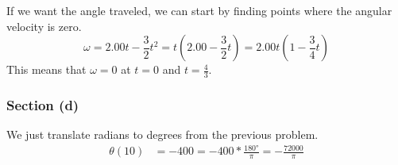 \documentclass[12pt]{article}
\begin{document}
If we want the angle traveled, we can start by finding points where the angular velocity is zero. 
\[ \omega = 2.00t - \frac{3}{2}t^2 = t(2.00 - \frac{3}{2}t) = 2.00t(1 - \frac{3}{4}t) \]
This means that $\omega = 0$ at $t = 0$ and $t = \frac{4}{3}$. 

\subsubsection*{Section (d)}
We just translate radians to degrees from the previous problem.
\begin{align*}
    \theta(10)  &=  -400
        =   -400 * \frac{180\unit{\degree}}{\pi}
        =   -\frac{72000}{\pi}
\end{align*}
\end{document}
